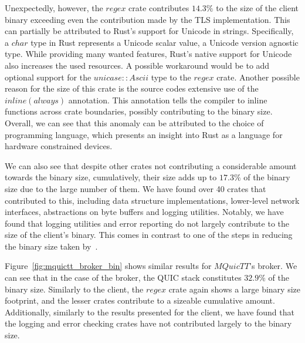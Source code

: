 Unexpectedly, however, the $regex$ crate contributes $14.3\%$ to the size of the client binary exceeding even the contribution made by the TLS implementation.
This can partially be attributed to Rust's support for Unicode in strings.
Specifically, a $char$ type in Rust represents a Unicode scalar value, a Unicode version agnostic type.
While providing many wanted features, Rust's native support for Unicode also increases the used resources.
A possible workaround would be to add optional support for the $unicase::Ascii$ type to the $regex$ crate.
Another possible reason for the size of this crate is the source codes extensive use of the $inline(always)$ annotation.
This annotation tells the compiler to inline functions across crate boundaries, possibly contributing to the binary size.
Overall, we can see that this anomaly can be attributed to the choice of programming language, which presents an insight into Rust as a language for hardware constrained devices.

We can also see that despite other crates not contributing a considerable amount towards the binary size, cumulatively, their size adds up to $17.3\%$ of the binary size due to the large number of them.
We have found over 40 crates that contributed to this, including data structure implementations, lower-level network interfaces, abstractions on byte buffers and logging utilities.
Notably, we have found that logging utilities and error reporting do not largely contribute to the size of the client's binary.
This comes in contrast to one of the steps in reducing the binary size taken by~\cite{eggert_towards_2020}.

Figure~\ref{fig:mquictt_broker_bin} shows similar results for $MQuicTT$'s broker.
We can see that in the case of the broker, the QUIC stack constitutes $32.9\%$ of the binary size.
Similarly to the client, the $regex$ crate again shows a large binary size footprint, and the lesser crates contribute to a sizeable cumulative amount.
Additionally, similarly to the results presented for the client, we have found that the logging and error checking crates have not contributed largely to the binary size.

